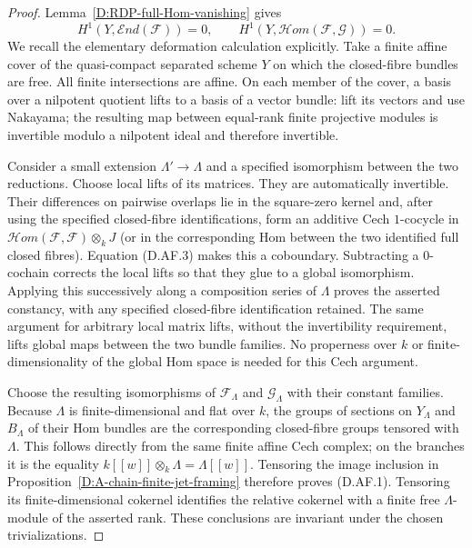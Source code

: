 \begin{proof}
Lemma~\ref{D:RDP-full-Hom-vanishing} gives
\[
 H^1(Y,\mathcal End(\mathcal F))=0,\qquad
 H^1(Y,\mathcal Hom(\mathcal F,\mathcal G))=0.             \tag{D.AF.3}
\]
We recall the elementary deformation calculation explicitly.
Take a finite affine cover of the quasi-compact separated
scheme $Y$ on which the closed-fibre bundles are free.
All finite intersections are affine.  On each member of
the cover, a basis over a nilpotent quotient lifts to a
basis of a vector bundle: lift its vectors and use
Nakayama; the resulting map between equal-rank finite
projective modules is invertible modulo a nilpotent ideal
and therefore invertible.

Consider a small extension $\Lambda'\to\Lambda$ and a
specified isomorphism between the two reductions.
Choose local lifts of its matrices.  They are automatically
invertible.  Their differences on pairwise overlaps lie
in the square-zero kernel and, after using the specified
closed-fibre identifications, form an additive Cech
$1$-cocycle in
$\mathcal Hom(\mathcal F,\mathcal F)\otimes_kJ$
(or in the corresponding Hom between the two identified
full closed fibres).  Equation (D.AF.3) makes this a
coboundary.  Subtracting a $0$-cochain corrects the local
lifts so that they glue to a global isomorphism.
Applying this successively along a composition series
of $\Lambda$ proves the asserted constancy, with any
specified closed-fibre identification retained.
The same argument for arbitrary local matrix lifts,
without the invertibility requirement, lifts global maps
between the two bundle families.
No properness over $k$ or finite-dimensionality of the
global Hom space is needed for this Cech argument.

Choose the resulting isomorphisms of $\mathcal F_\Lambda$
and $\mathcal G_\Lambda$ with their constant families.
Because $\Lambda$ is finite-dimensional and flat over $k$,
the groups of sections on $Y_\Lambda$ and $B_\Lambda$
of their Hom bundles are the corresponding closed-fibre
groups tensored with $\Lambda$.  This follows directly
from the same finite affine Cech complex; on the branches
it is the equality
$k[[w]]\otimes_k\Lambda=\Lambda[[w]]$.
Tensoring the image inclusion in
Proposition~\ref{D:A-chain-finite-jet-framing}
therefore proves (D.AF.1).
Tensoring its finite-dimensional cokernel identifies
the relative cokernel with a finite free $\Lambda$-module
of the asserted rank.  These conclusions are invariant
under the chosen trivializations.


\end{proof}
